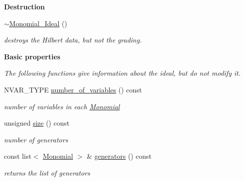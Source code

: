 \begin{Indent}\textbf{ Destruction}\par
\begin{DoxyCompactItemize}
\item 
\mbox{\label{group__polygroup_a96f5e7396229382fbcbe8f7c4ceeaa65}} 
\hyperlink{group__polygroup_a96f5e7396229382fbcbe8f7c4ceeaa65}{$\sim$\+Monomial\+\_\+\+Ideal} ()
\begin{DoxyCompactList}\small\item\em destroys the Hilbert data, but not the grading. \end{DoxyCompactList}\end{DoxyCompactItemize}
\end{Indent}
\begin{Indent}\textbf{ Basic properties}\par
{\em The following functions give information about the ideal, but do not modify it. }\begin{DoxyCompactItemize}
\item 
\mbox{\label{group__polygroup_a606b7dd86fedd848182e6a4a6d18c77d}} 
N\+V\+A\+R\+\_\+\+T\+Y\+PE \hyperlink{group__polygroup_a606b7dd86fedd848182e6a4a6d18c77d}{number\+\_\+of\+\_\+variables} () const
\begin{DoxyCompactList}\small\item\em number of variables in each {\ttfamily \hyperlink{group__polygroup_class_monomial}{Monomial}} \end{DoxyCompactList}\item 
\mbox{\label{group__polygroup_a31f60f6a6370dc419d8083d3f3f469cc}} 
unsigned \hyperlink{group__polygroup_a31f60f6a6370dc419d8083d3f3f469cc}{size} () const
\begin{DoxyCompactList}\small\item\em number of generators \end{DoxyCompactList}\item 
\mbox{\label{group__polygroup_a2b7a092c8889479db32c76c0d2a65eae}} 
const list$<$ \hyperlink{group__polygroup_class_monomial}{Monomial} $>$ \& \hyperlink{group__polygroup_a2b7a092c8889479db32c76c0d2a65eae}{generators} () const
\begin{DoxyCompactList}\small\item\em returns the list of generators \end{DoxyCompactList}\item 

\end{DoxyCompactItemize}
\end{Indent}
